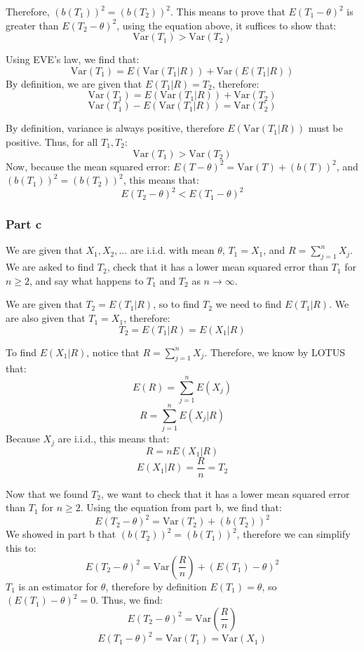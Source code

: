 \documentclass{article}
\begin{document}
Therefore, $(b(T_{1}))^{2} = (b(T_{2}))^{2}$. This means to prove that $E(T_{1} - \theta)^{2}$ is greater than $E(T_{2} - \theta)^{2}$, using the equation above, it suffices to show that:
$$\text{Var}(T_{1}) > \text{Var}(T_{2})$$

Using EVE's law, we find that:
$$\text{Var}(T_{1}) = E(\text{Var}(T_{1}|R)) + \text{Var}(E(T_{1}|R))$$
By definition, we are given that $E(T_{1}|R) = T_{2}$, therefore:
$$\text{Var}(T_{1}) = E(\text{Var}(T_{1}|R)) + \text{Var}(T_{2})$$
$$\text{Var}(T_{1}) - E(\text{Var}(T_{1}|R)) = \text{Var}(T_{2})$$

By definition, variance is always positive, therefore $E(\text{Var}(T_{1}|R))$ must be positive. Thus, for all $T_{1}, T_{2}$:
$$\text{Var}(T_{1}) > \text{Var}(T_{2})$$
Now, because the mean squared error: $E(T - \theta)^{2} = \text{Var}(T) + (b(T))^{2}$, and $(b(T_{1}))^{2} = (b(T_{2}))^{2}$, this means that:
$$E(T_{2} - \theta)^{2} < E(T_{1} - \theta)^{2}$$

\subsubsection{Part c}
We are given that $X_{1}, X_{2}, . . .$ are i.i.d. with mean $\theta$, $T_{1} = X_{1}$, and $R = \sum_{j = 1}^{n} X_{j}$. We are asked to find $T_{2}$, check that it has a lower mean squared error than $T_{1}$ for $n \geq 2$, and say what happens to $T_{1}$ and $T_{2}$ as $n \rightarrow \infty$.

We are given that $T_{2} = E(T_{1}|R)$, so to find $T_{2}$ we need to find $E(T_{1}|R)$. We are also given that $T_{1} = X_{1}$, therefore:
$$T_{2} = E(T_{1}|R) = E(X_{1}|R)$$

To find $E(X_{1}|R)$, notice that $R = \sum_{j = 1}^{n} X_{j}$. Therefore, we know by LOTUS that:
$$E(R) = \sum_{j = 1}^{n} E(X_{j})$$
$$R = \sum_{j = 1}^{n} E(X_{j}|R)$$
Because $X_{j}$ are i.i.d., this means that:
$$R = nE(X_{1}|R)$$
$$E(X_{1}|R) = \frac{R}{n} = T_{2}$$

Now that we found $T_{2}$, we want to check that it has a lower mean squared error than $T_{1}$ for $n \geq 2$. Using the equation from part b, we find that:
$$E(T_{2} - \theta)^{2} = \text{Var}(T_{2}) + (b(T_{2}))^{2}$$
We showed in part b that $(b(T_{2}))^{2} = (b(T_{1}))^{2}$, therefore we can simplify this to:
$$E(T_{2} - \theta)^{2} = \text{Var}(\frac{R}{n}) + (E(T_{1}) - \theta)^{2}$$
$T_{1}$ is an estimator for $\theta$, therefore by definition $E(T_{1}) = \theta$, so $(E(T_{1}) - \theta)^{2} = 0$. Thus, we find:
$$E(T_{2} - \theta)^{2} = \text{Var}(\frac{R}{n})$$
$$E(T_{1} - \theta)^{2} = \text{Var}(T_{1}) = \text{Var}(X_{1})$$
\end{document}
